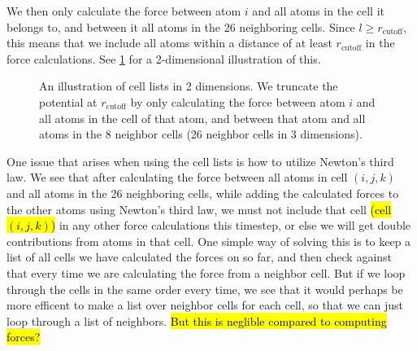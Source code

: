 We then only calculate the force between atom $i$ and all atoms in the cell it belongs to, and between it all atoms in the 26 neighboring cells. Since $l\geq r_\text{cutoff}$, this means that we include all atoms within a distance of at least $r_\text{cutoff}$ in the force calculations. See \cref{fig:cell_lists} for a 2-dimensional illustration of this.
\begin{figure}[htpb]%
    \centering%
    \caption{%
        An illustration of cell lists in 2 dimensions. We truncate the potential at $r_\text{cutoff}$ by only calculating the force between atom $i$ and all atoms in the cell of that atom, and between that atom and all atoms in the 8 neighbor cells (26 neighbor cells in 3 dimensions). %
        \label{fig:cell_lists}%
    }%
\end{figure}%

One issue that arises when using the cell lists is how to utilize Newton's third law. We see that after calculating the force between all atoms in cell $(i,j,k)$ and all atoms in the 26 neighboring cells, while adding the calculated forces to the other atoms using Newton's third law, we must not include that cell \hl{(cell $(i,j,k)$)} in any other force calculations this timestep, or else we will get double contributions from atoms in that cell. One simple way of solving this is to keep a list of all cells we have calculated the forces on so far, and then check against that every time we are calculating the force from a neighbor cell. But if we loop through the cells in the same order every time, we see that it would perhaps be more efficent to make a list over neighbor cells for each cell, so that we can just loop through a list of neighbors. \hl{But this is neglible compared to computing forces?}

